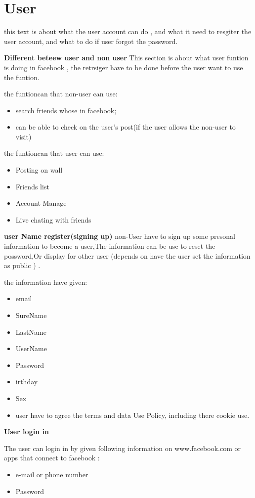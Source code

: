 \section{User}
this text is about what the user account can do , and what it need to resgiter
the user account, and what to do if user forgot the password.

\textbf{Different beteew user and non user}
This section is about what user funtion is doing in facebook , the retrsiger
have to be done before the user want to use the funtion.

the funtioncan that non-user can use:
\begin{itemize}
\item search friends whose in facebook;
\item can be able to check on the user's post(if the user allows the non-user to
visit)
\end{itemize}

the funtioncan that user can use:
\begin{itemize}
\item Posting on wall
\item Friends list 
\item Account Manage
\item Live chating with friends
\end{itemize}

\textbf{user Name register(signing up)}
non-User have to sign up some presonal information to become a user,The
information can be use to reset the possword,Or display for other user (depends
on have the user set the information as public ) .

the information have given:
\begin{itemize}
\item email
\item SureName
\item LastName
\item UserName
\item Password
\item irthday
\item Sex
\item user have to agree the terms and data Use Policy, including there cookie
      use.
\end{itemize}

\textbf{User login in}

The user can login in by given following information on www.facebook.com or apps
that connect to facebook : 

\begin{itemize}
\item e-mail or phone number 
\item Password
\end{itemize}


